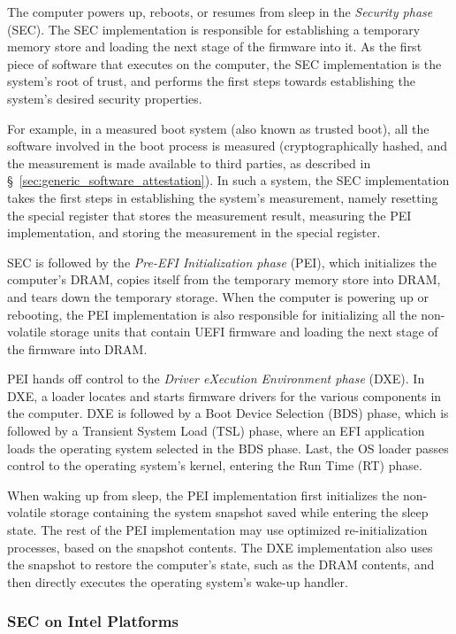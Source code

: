 The computer powers up, reboots, or resumes from sleep in the
\textit{Security phase} (SEC). The SEC implementation is responsible for
establishing a temporary memory store and loading the next stage of the
firmware into it. As the first piece of software that executes on the computer,
the SEC implementation is the system's root of trust, and performs the first
steps towards establishing the system's desired security properties.

For example, in a measured boot system (also known as trusted boot), all the
software involved in the boot process is measured (cryptographically hashed,
and the measurement is made available to third parties, as described in
\S~\ref{sec:generic_software_attestation}). In such a system, the SEC
implementation takes the first steps in establishing the system's measurement,
namely resetting the special register that stores the measurement result,
measuring the  PEI implementation, and storing the measurement in the special
register.

SEC is followed by the \textit{Pre-EFI Initialization phase} (PEI), which
initializes the computer's DRAM, copies itself from the temporary memory
store into DRAM, and tears down the temporary storage. When the computer is
powering up or rebooting, the PEI implementation is also responsible for
initializing all the non-volatile storage units that contain UEFI firmware and
loading the next stage of the firmware into DRAM.

PEI hands off control to the \textit{Driver eXecution Environment phase} (DXE).
In DXE, a loader locates and starts firmware drivers for the various components
in the computer. DXE is followed by a Boot Device Selection (BDS) phase, which
is followed by a Transient System Load (TSL) phase, where an EFI application
loads the operating system selected in the BDS phase. Last, the OS loader
passes control to the operating system's kernel, entering the Run Time (RT)
phase.

When waking up from sleep, the PEI implementation first initializes the
non-volatile storage containing the system snapshot saved while entering the
sleep state. The rest of the PEI implementation may use optimized
re-initialization processes, based on the snapshot contents. The DXE
implementation also uses the snapshot to restore the computer's state, such as
the DRAM contents, and then directly executes the operating system's wake-up
handler.


\subsubsection{SEC on Intel Platforms}
\label{sec:uefi_sec_details}

